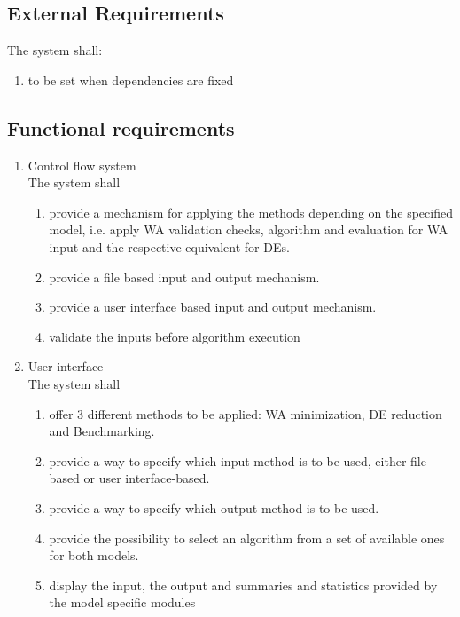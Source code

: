         \subsection{External Requirements}
            The system shall:
            \begin{enumerate}[E 1.]
                \item to be set when dependencies are fixed
            \end{enumerate}
                    
        \subsection{Functional requirements}
            \begin{enumerate}[F 1.]
                \item Control flow system \\
                The system shall
                    \begin{enumerate}[1.]
                        \item provide a mechanism for applying the methods depending on the specified model, i.e. apply WA validation checks, algorithm and evaluation for WA input and the respective equivalent for DEs.
                        \item provide a file based input and output mechanism.
                        \item provide a user interface based input and output mechanism.
                        \item validate the inputs before algorithm execution
                    \end{enumerate}

                \item User interface\\
                    The system shall
                    \begin{enumerate}[1.]
                        \item offer 3 different methods to be applied: WA minimization, DE reduction and Benchmarking.
                        \item provide a way to specify which input method is to be used, either file-based or user interface-based.
                        \item provide a way to specify which output method is to be used.
                        \item provide the possibility to select an algorithm from a set of available ones for both models.
                        \item display the input, the output and summaries and statistics provided by the model specific modules
                    \end{enumerate}


\end{enumerate}
